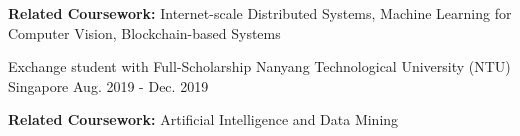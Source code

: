 \begin{cventries}
{\begin{cvitems}
        \item {\textbf{Related Coursework:} Internet-scale Distributed Systems, Machine Learning for Computer Vision, Blockchain-based Systems}
      \end{cvitems}
    }
\cvopenentry
    {Exchange student with Full-Scholarship}
    {Nanyang Technological University (NTU)} %
    {Singapore} %
    {Aug. 2019 - Dec. 2019} %
    {\begin{cvitems} %
        \item {\textbf{Related Coursework:} Artificial Intelligence and Data Mining}
      \end{cvitems}
    }
   
\end{cventries}
